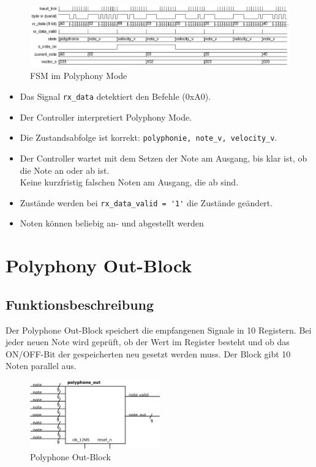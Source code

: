 \begin{figure}[H]
	\includegraphics[width=1\textwidth]{images/midi_control/wave_polyphonie.png}
	\caption{FSM im Polyphony Mode}
	\label{fig.midicontrol_polyphonie}
\end{figure}

\begin{itemize}
	\item Das Signal \lstinline|rx_data| detektiert den Befehle (0xA0).
	\item Der Controller interpretiert Polyphony Mode. 
	\item Die Zustandsabfolge ist korrekt: \lstinline|polyphonie, note_v, velocity_v|.
	\item Der Controller wartet mit dem Setzen der Note am Ausgang, bis klar ist, ob die Note an oder ab ist.\\
	Keine kurzfristig falschen Noten am Ausgang, die ab sind.
	\item Zustände werden bei \lstinline|rx_data_valid = '1'| die Zustände geändert.
	\item Noten können beliebig an- und abgestellt werden
\end{itemize}

\section{Polyphony Out-Block}\label{sect.polyphonie_umsetzung}
 
\subsection{Funktionsbeschreibung}

Der Polyphone Out-Block speichert die empfangenen Signale in 10 Registern. Bei jeder neuen Note wird geprüft, ob der Wert im Register besteht und ob das ON/OFF-Bit der gespeicherten neu gesetzt werden muss. Der Block gibt 10 Noten parallel aus.

\begin{figure}[H]
	\includegraphics[width=0.5\textwidth]{images/midi_interface/polyphonie_blockschaltbild.png}
	\caption{Polyphone Out-Block}
	\label{fig.polyphnie_out_block}
\end{figure}

